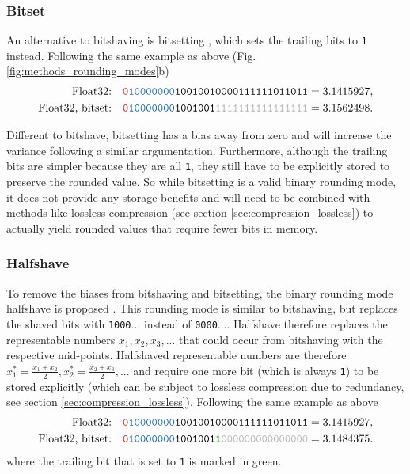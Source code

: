 \subsubsection{Bitset}
An alternative to bitshaving is bitsetting \citep{Zender2016}, which sets the trailing bits to \texttt{1} instead. Following the same
example as above (Fig. \ref{fig:methods_rounding_modes}b)
\begin{align}
	\text{Float32:}& \quad \mathtt{{\color{psign}0}{\color{pexpo}10000000}10010010000111111011011} = 3.1415927, \nonumber \\
	\text{Float32, bitset:}& \quad \mathtt{{\color{psign}0}{\color{pexpo}10000000}1001001{\color{gray}1111111111111111}} = 3.1562498.
	\label{eq:bitset}
\end{align}

Different to bitshave, bitsetting has a bias away from zero and will increase the variance following a similar argumentation. Furthermore,
although the trailing bits are simpler because they are all \texttt{1}, they still have to be explicitly stored to preserve the rounded
value. So while bitsetting is a valid binary rounding mode, it does not provide any storage benefits and will need to be combined
with methods like lossless compression (see section \ref{sec:compression_lossless}) to actually yield rounded
values that require fewer bits in memory.

\subsubsection{Halfshave}
To remove the biases from bitshaving and bitsetting, the binary rounding mode halfshave is proposed \citep{Zender2016,Kouznetsov2020}.
This rounding mode is similar to bitshaving, but replaces the shaved bits with \texttt{1000$...$} instead of \texttt{0000$...$}.
Halfshave therefore replaces the representable numbers $x_1,x_2,x_3,...$ that could occur from bitshaving with the respective mid-points.
Halfshaved representable numbers are therefore $x_1^* = \tfrac{x_1+x_2}{2}, x_2^* = \tfrac{x_2 + x_3}{2}, ...$ and require
one more bit (which is always \texttt{1}) to be stored explicitly (which can be subject to lossless compression due to redundancy,
see section \ref{sec:compression_lossless}). Following the same example as above
\begin{align}
	\text{Float32:}& \quad \mathtt{{\color{psign}0}{\color{pexpo}10000000}10010010000111111011011} = 3.1415927, \nonumber \\
	\text{Float32, bitset:}& \quad \mathtt{{\color{psign}0}{\color{pexpo}10000000}1001001{\color{mygreen}1}
	{\color{gray}000000000000000}} = 3.1484375.
	\label{eq:halfshave}
\end{align}
where the trailing bit that is set to \texttt{1} is marked in green. 

